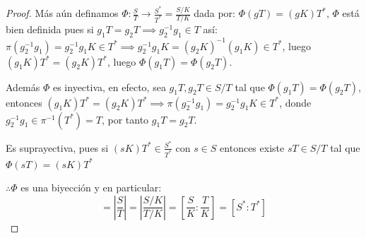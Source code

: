 \begin{proof}
	Más aún definamos $\Phi: \frac{S}{T} \to \frac{S^*}{T^*} = \frac{S/K}{T/K}$ dada por: $\Phi(gT) = (gK)T^*$, $\Phi$ está bien definida pues si $g_1 T = g_2 T \implies g_2^{-1}g_1 \in T$ así: $\pi(g_2^{-1}g_1) = g_2^{-1}g_1 K \in T^* \implies g_2^{-1}g_1 K = (g_2 K)^{-1}(g_1 K) \in T^*$, luego $(g_1 K)T^* = (g_2 K)T^*$, luego $\Phi(g_1 T) = \Phi(g_2 T)$.


	Además $\Phi$ es inyectiva, en efecto, sea $g_1 T, g_2 T \in S/T$ tal que $\Phi(g_1 T) = \Phi(g_2 T)$, entonces $(g_1 K)T^* = (g_2 K)T^* \implies \pi(g_2^{-1}g_1) = g_2^{-1}g_1 K \in T^*$, donde $g_2^{-1}g_1 \in \pi^{-1}(T^*) = T$, por tanto $g_1 T = g_2 T$.

	Es suprayectiva, pues si $(sK)T^* \in \frac{S^*}{T^*}$ con $s \in S$ entonces existe $sT \in S/T$ tal que $\Phi(sT) = (sK)T^*$

	$\therefore \Phi$ es una biyección y en particular:
	\begin{equation*}
		[S:T] = \left| \frac{S}{T} \right| = \left| \frac{S/K}{T/K} \right| = \left[ \frac{S}{K} : \frac{T}{K} \right] = [S^* : T^*]
	\end{equation*}

\end{proof}
